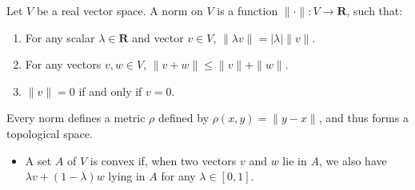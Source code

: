 \begin{definition}
    Let $V$ be a real vector space. A norm on $V$ is a function $\| \cdot \|: V \to \mathbf{R}$, such that:
    \begin{enumerate}
        \item For any scalar $\lambda \in \mathbf{R}$ and vector $v \in V$, $\| \lambda v \| = | \lambda | \| v \|$.
        \item For any vectors $v,w \in V$, $\| v + w \| \leq \| v \| + \| w \|$.
        \item $\| v \| = 0$ if and only if $v = 0$.
    \end{enumerate}
    Every norm defines a metric $\rho$ defined by $\rho(x,y) = \| y - x \|$, and thus forms a topological space.
    \begin{itemize}
        \item A set $A$ of $V$ is convex if, when two vectors $v$ and $w$ lie in $A$, we also have $\lambda v + (1 - \lambda) w$ lying in $A$ for any $\lambda \in [0,1]$.
    \end{itemize}
\end{definition}

